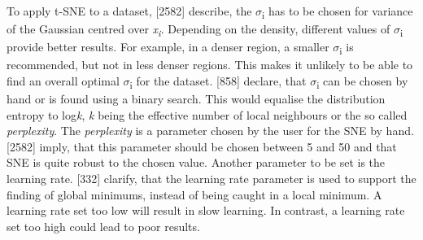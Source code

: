 To apply t-SNE to a dataset, \textcite{maaten2008visualizing}[2582] describe, the $\sigma$\textsubscript{i} has to be chosen for variance of the Gaussian centred over \textit{x\textsubscript{i}}. Depending on the density, different values of $\sigma$\textsubscript{i} provide better results. For example, in a denser region, a smaller $\sigma$\textsubscript{i} is recommended, but not in less denser regions. This makes it unlikely to be able to find an overall optimal  $\sigma$\textsubscript{i} for the dataset. \textcite{hinton2003stochastic}[858] declare, that $\sigma$\textsubscript{i} can be chosen by hand or is found using a binary search. This would equalise the distribution entropy to log\textit{k}, \textit{k} being the effective number of local neighbours or the so called \textit{perplexity}. The \textit{perplexity} is a parameter chosen by the user for the SNE by hand. \textcite{maaten2008visualizing}[2582] imply, that this parameter should be chosen between 5 and 50 and that SNE is quite robust to the chosen value. 
Another parameter to be set is the learning rate. \textcite{han2011data}[332] clarify, that the learning rate parameter is used to support the finding of global minimums, instead of being caught in a local minimum. A learning rate set too low will result in slow learning. In contrast, a learning rate set too high could lead to poor results.

